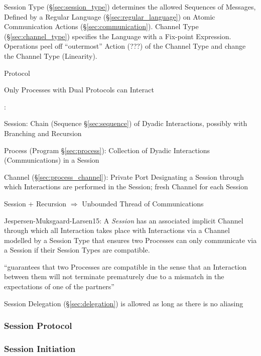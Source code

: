 Session Type (\S\ref{sec:session_type}) determines the allowed
Sequences of Messages, Defined by a Regular Language
(\S\ref{sec:regular_language}) on Atomic Communication Actions
(\S\ref{sec:communication}). Channel Type (\S\ref{sec:channel_type})
specifies the Language with a Fix-point Expression. Operations peel
off ``outermost'' Action (???) of the Channel Type and change the
Channel Type (Linearity). \cite{neubauer-thiemann04}

Protocol

Only Processes with Dual Protocols can Interact

\cite{honda-vasconcelos-kubo98}:

Session: Chain (Sequence \S\ref{sec:sequence}) of Dyadic Interactions,
possibly with Branching and Recursion

Process (Program \S\ref{sec:process}): Collection of Dyadic
Interactions (Communications) in a Session

Channel (\S\ref{sec:process_channel}): Private Port Designating a
Session through which Interactions are performed in the Session; fresh
Channel for each Session

Session + Recursion $\Rightarrow$ Unbounded Thread of Communications
\cite{honda-vasconcelos-kubo98}

Jespersen-Muksgaard-Larsen15: A \emph{Session} has an associated
implicit Channel through which all Interaction takes place with
Interactions via a Channel modelled by a Session Type that ensures two
Processes can only communicate via a Session if their Session Types
are compatible.

``guarantees that two Processes are compatible in the sense that an
Interaction between them will not terminate prematurely due to a
mismatch in the expectations of one of the partners''
\cite{gay-vasconcelos10}

Session Delegation (\S\ref{sec:delegation}) is allowed as long as
there is no aliasing



\subsubsection{Session Protocol}\label{sec:session_protocol}

\subsubsection{Session Initiation}\label{sec:session_initiation}

